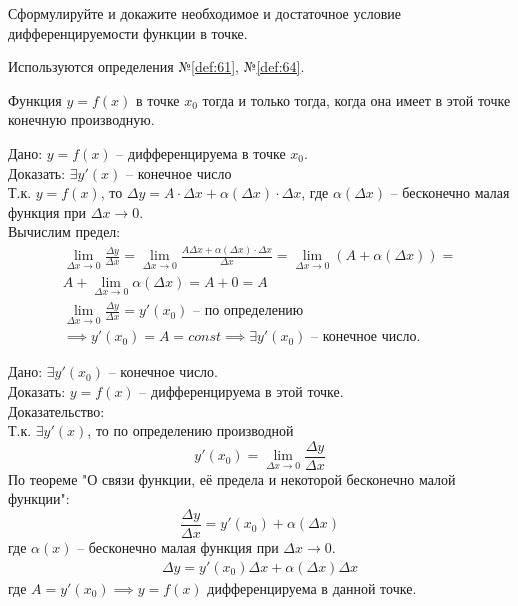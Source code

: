 \begin{question}
    Сформулируйте и докажите необходимое и достаточное условие дифференцируемости функции в точке.
\end{question}
\begin{used}
    Используются определения №\ref{def:61}, №\ref{def:64}.
\end{used}
\begin{theorem}
    Функция $y = f(x)$ в точке  $x_0$ тогда и только тогда, когда она имеет в этой точке конечную производную.
\end{theorem}
\begin{necessity}
    Дано: $y = f(x)$ -- дифференцируема в точке  $x_0$. \\
    Доказать: $\exists  y'(x)$ -- конечное число \\
    Т.к. $y = f(x)$, то  $\Delta y = A \cdot \Delta x + \alpha(\Delta x) \cdot \Delta x$, где $\alpha(\Delta x)$ -- бесконечно малая функция при $\Delta x \to 0$. \\
    Вычислим предел: 
    \begin{gather*}
        \lim_{\Delta x \to 0} \frac{\Delta y}{\Delta x} = \lim_{\Delta x \to 0} \frac{A \Delta x + \alpha(\Delta x) \cdot \Delta x}{\Delta x} = \lim_{\Delta x \to 0} \left( A + \alpha(\Delta x) \right)  = \\
        A + \lim_{\Delta x \to 0} \alpha(\Delta x) = A + 0 = A \\
        \lim_{\Delta x \to 0} \frac{\Delta y}{\Delta x} = y'(x_0) \text{ -- по определению} \\
        \implies y'(x_0) = A = const \implies \exists  y'(x_0) \text{ -- конечное число}.
    \end{gather*}
\end{necessity}
\begin{sufficiency}
    Дано: $\exists y'(x_0)$ -- конечное число. \\
    Доказать: $y = f(x)$ -- дифференцируема в этой точке. \\
    Доказательство: \\
    Т.к. $\exists y'(x)$, то по определению производной  \[
        y'(x_{0}) = \lim_{\Delta x \to 0} \frac{\Delta y}{\Delta x}
    \]
    По теореме "О связи функции, её предела и некоторой бесконечно малой функции": \[
    \frac{\Delta y}{\Delta x} = y'(x_0) + \alpha(\Delta x)
    \] 
    где $\alpha(x)$ -- бесконечно малая функция при $\Delta x \to 0$.
    \begin{gather*}
        \Delta y = y'(x_0) \Delta x + \alpha(\Delta x) \Delta x
    \end{gather*}
    где $A = y'(x_0) \implies y = f(x)$ дифференцируема в данной точке.
\end{sufficiency}
\pagebreak



